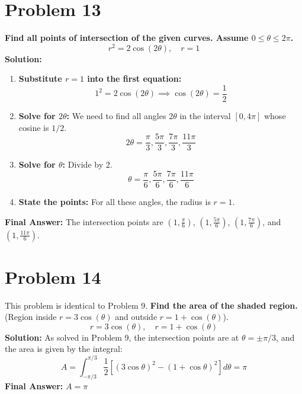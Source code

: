 \documentclass{article}
\begin{document}
\section*{Problem 13}
\textbf{Find all points of intersection of the given curves. Assume $0 \le \theta \le 2\pi$.}
\[ r^2 = 2\cos(2\theta), \quad r = 1 \]
\textbf{Solution:}
\begin{enumerate}
    \item \textbf{Substitute $r=1$ into the first equation:}
    \[ 1^2 = 2\cos(2\theta) \implies \cos(2\theta) = \frac{1}{2} \]
    \item \textbf{Solve for $2\theta$:} We need to find all angles $2\theta$ in the interval $[0, 4\pi]$ whose cosine is $1/2$.
    \[ 2\theta = \frac{\pi}{3}, \frac{5\pi}{3}, \frac{7\pi}{3}, \frac{11\pi}{3} \]
    \item \textbf{Solve for $\theta$:} Divide by 2.
    \[ \theta = \frac{\pi}{6}, \frac{5\pi}{6}, \frac{7\pi}{6}, \frac{11\pi}{6} \]
    \item \textbf{State the points:} For all these angles, the radius is $r=1$.
\end{enumerate}
\textbf{Final Answer:} The intersection points are $(1, \frac{\pi}{6})$, $(1, \frac{5\pi}{6})$, $(1, \frac{7\pi}{6})$, and $(1, \frac{11\pi}{6})$.

\section*{Problem 14}
This problem is identical to Problem 9.
\textbf{Find the area of the shaded region.} (Region inside $r = 3\cos(\theta)$ and outside $r=1+\cos(\theta)$).
\[ r = 3\cos(\theta), \quad r = 1 + \cos(\theta) \]
\textbf{Solution:}
As solved in Problem 9, the intersection points are at $\theta = \pm \pi/3$, and the area is given by the integral:
\[ A = \int_{-\pi/3}^{\pi/3} \frac{1}{2} \left[ (3\cos\theta)^2 - (1+\cos\theta)^2 \right] d\theta = \pi \]
\textbf{Final Answer:} $A = \pi$
\end{document}
